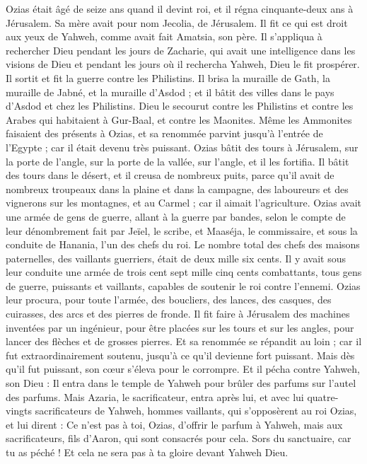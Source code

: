 \begin{multicols}{2}
Ozias était âgé de seize ans quand il devint roi, et il régna cinquante-deux ans à Jérusalem. Sa mère avait pour nom Jecolia, de Jérusalem.
Il fit ce qui est droit aux yeux de Yahweh, comme avait fait Amatsia, son père.
Il s'appliqua à rechercher Dieu pendant les jours de Zacharie, qui avait une intelligence dans les visions de Dieu  et pendant les jours où il rechercha Yahweh, Dieu le fit prospérer.
Il sortit et fit la guerre contre les Philistins. Il brisa la muraille de Gath, la muraille de Jabné, et la muraille d'Asdod ; et il bâtit des villes dans le pays d'Asdod et chez les Philistins.
Dieu le secourut contre les Philistins et contre les Arabes qui habitaient à Gur-Baal, et contre les Maonites.
Même les Ammonites faisaient des présents à Ozias, et sa renommée parvint jusqu'à l'entrée de l'Egypte ; car il était devenu très puissant.
Ozias bâtit des tours à Jérusalem, sur la porte de l'angle, sur la porte de la vallée, sur l'angle, et il les fortifia.
Il bâtit des tours dans le désert, et il creusa de nombreux puits, parce qu'il avait de nombreux troupeaux dans la plaine et dans la campagne, des laboureurs et des vignerons sur les montagnes, et au Carmel ; car il aimait l'agriculture.
Ozias avait une armée de gens de guerre, allant à la guerre par bandes, selon le compte de leur dénombrement fait par Jeïel, le scribe, et Maaséja, le commissaire, et sous la conduite de Hanania, l'un des chefs du roi.
Le nombre total des chefs des maisons paternelles, des vaillants guerriers, était de deux mille six cents.
Il y avait sous leur conduite une armée de trois cent sept mille cinq cents combattants, tous gens de guerre, puissants et vaillants, capables de soutenir le roi contre l'ennemi.
Ozias leur procura, pour toute l'armée, des boucliers, des lances, des casques, des cuirasses, des arcs et des pierres de fronde.
Il fit faire à Jérusalem des machines inventées par un ingénieur, pour être placées sur les tours et sur les angles, pour lancer des flèches et de grosses pierres. Et sa renommée se répandit au loin ; car il fut extraordinairement soutenu, jusqu'à ce qu'il devienne fort puissant.
Mais dès qu’il fut puissant, son cœur s'éleva pour le corrompre. Et il pécha contre Yahweh, son Dieu : Il entra dans le temple de Yahweh pour brûler des parfums sur l'autel des parfums.
Mais Azaria, le sacrificateur, entra après lui, et avec lui quatre-vingts sacrificateurs de Yahweh, hommes vaillants,
qui s'opposèrent au roi Ozias, et lui dirent : Ce n'est pas à toi, Ozias, d'offrir le parfum à Yahweh, mais aux sacrificateurs, fils d'Aaron, qui sont consacrés pour cela. Sors du sanctuaire, car tu as péché ! Et cela ne sera pas à ta gloire devant Yahweh Dieu.

\end{multicols}
